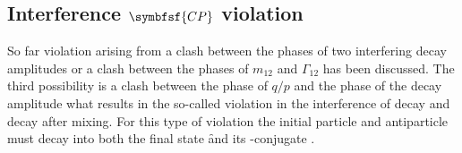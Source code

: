 \subsection[head={Interference \CP violation},tocentry={Interference \CP violation}]{Interference $\symbfsf{C{}P}$ violation}
\label{sec:InterferenceCPV}

So far \CP violation arising from a clash between the phases of two interfering decay amplitudes or a clash between the phases of $m_{12}$ and $\Gamma_{12}$ has been discussed.
The third possibility is a clash between the phase of $q/p$ and the phase of the decay amplitude what results in the so-called \CP violation in the interference of decay and decay after mixing.
For this type of \CP violation the initial particle \Paz and antiparticle \Pazb must decay into both the final state \f and its \CP-conjugate \fbar.

